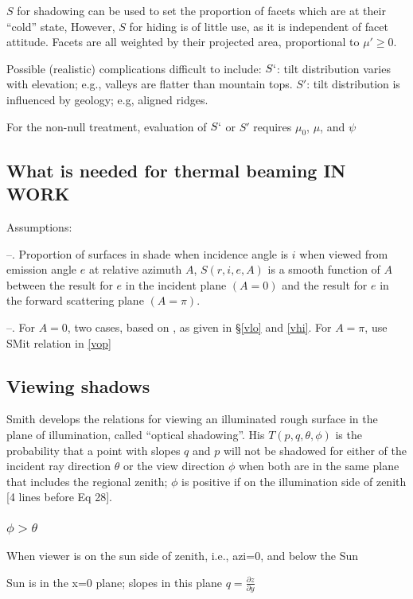 \documentclass{article}
\begin{document}
$S$ for shadowing can be used to set the proportion of facets which are at their
``cold'' state, However, $S$ for hiding is of little use, as it is independent
of facet attitude. Facets are all weighted by their projected area, proportional
to $\mu' \geq 0 $.

Possible (realistic) complications difficult to include:
\qi $S`$: tilt distribution varies with elevation; e.g., valleys are flatter than mountain tops. 
\qi $S'$: tilt distribution is influenced by geology; e.g, aligned ridges.

For the non-null treatment, evaluation of $S`$ or $S'$ requires $\mu_0$, $\mu$,
and $\psi$

\subsection{What is needed for thermal beaming   IN WORK}
Assumptions: 


--. Proportion of surfaces in shade when incidence angle is $i$ when viewed from emission angle $e$ at relative azimuth $A$, $S(r,i,e,A)$ is a smooth function of $A$  between the result for $e$ in the incident plane $(A=0)$ and the result for $e$ in the forward scattering plane $(A=\pi)$. 

--. For $A=0$, two cases, based on , as given in \S \ref{vlo} and \ref{vhi}. For $A=\pi$, use SMit relation in \ref{vop}


\subsection{Viewing shadows}
 Smith develops the relations for viewing an illuminated rough surface in the
 plane of illumination, called ``optical shadowing''. His $T(p,q,\theta,\phi)$
 is the probability that a point with slopes $q$ and $p$ will not be shadowed
 for either of the incident ray direction $\theta$ or the view direction $\phi$
 when both are in the same plane that includes the regional zenith; $\phi$ is
 positive if on the illumination side of zenith [4 lines before Eq 28].

\subsubsection { $\phi > \theta$ } When viewer is on the sun side of zenith, i.e., azi=0, and below the Sun

Sun is in the x=0 plane; slopes in this plane $q= \frac{\partial z}{\partial y}$
\end{document}
